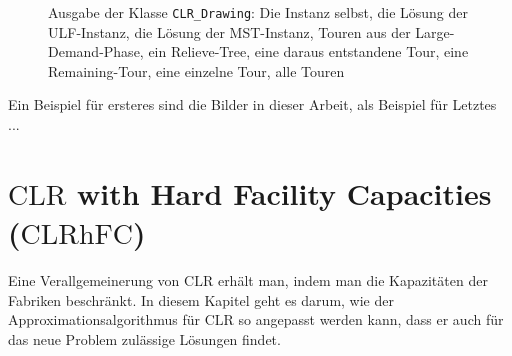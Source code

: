 \documentclass[a4paper,ngerman,12pt,bibtotoc]{scrartcl}
\theoremstyle{definition}
\theoremstyle{plain}
\theoremstyle{remark}
\newcommand{\CLR}{\mathrm{CLR}}
\newcommand{\CLRHFC}{\mathrm{CLRhFC}}
\begin{document}
\begin{figure}[H]
	
	\caption{Ausgabe der Klasse \texttt{CLR\_Drawing}: Die Instanz selbst, die Lösung der ULF-Instanz, die Lösung der MST-Instanz, Touren aus der Large-Demand-Phase, ein Relieve-Tree, eine daraus entstandene Tour, eine Remaining-Tour, eine einzelne Tour, alle Touren}
\end{figure}

Ein Beispiel für ersteres sind die Bilder in dieser Arbeit, als Beispiel für Letztes ...


	

\section{$\CLR$ with Hard Facility Capacities ($\CLRHFC$)}

Eine Verallgemeinerung von $\CLR$ erhält man, indem man die Kapazitäten der Fabriken beschränkt. In diesem Kapitel geht es darum, wie der Approximationsalgorithmus für $\CLR$ so angepasst werden kann, dass er auch für das neue Problem zulässige Lösungen findet.
\end{document}
